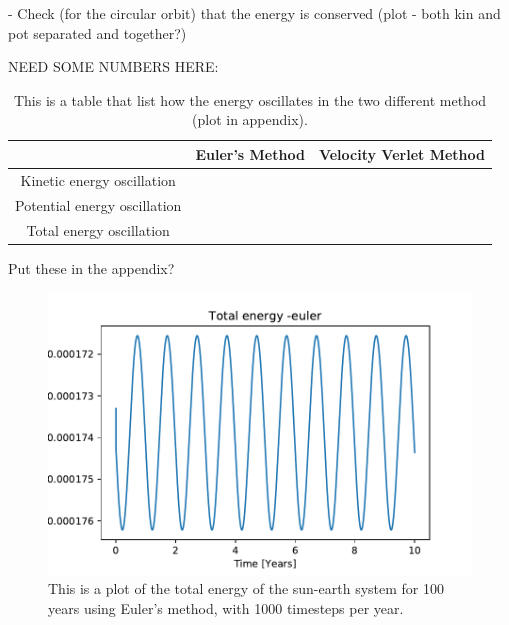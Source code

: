 	- Check (for the circular orbit) that the energy is conserved (plot - both kin and pot separated and together?)

NEED SOME NUMBERS HERE:

\begin{table}[H]\caption{This is a table that list how the energy oscillates in the two different method (plot in appendix).}\label{tab:energy_oscillations}
\begin{tabular}{ccc}
 & Euler's Method & Velocity Verlet Method\\ \hline
Kinetic energy oscillation & & \\
Potential energy oscillation & & \\
Total energy oscillation & & \\
\end{tabular}
\end{table}

Put these in the appendix?

\begin{figure}[H]
\includegraphics[width=1.1\linewidth]{../results/plots/totalenergy-euler.pdf}\caption{This is a plot of the total energy of the sun-earth system for 100 years using Euler's method, with 1000 timesteps per year.}\label{fig:totalenergy-euler}
\end{figure}	

